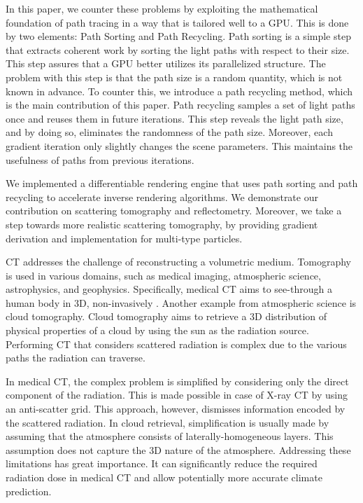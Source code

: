 \documentclass{article}
\begin{document}
In this paper, we counter these problems by exploiting the mathematical foundation of path tracing in a way that is tailored well to a \ac{GPU}. This is done by two elements: Path Sorting and Path Recycling. Path sorting is a simple step that extracts coherent work by sorting the light paths with respect to their size. This step assures that a \ac{GPU} better utilizes its parallelized structure. The problem with this step is that the path size is a random quantity, which is not known in advance. To counter this, we introduce a  path recycling method, which is the main contribution of this paper. Path recycling samples a set of light paths once and reuses them in future iterations. This step reveals the light path size, and by doing so, eliminates the randomness of the path size. Moreover, each gradient iteration only slightly changes the scene parameters. This maintains the usefulness of paths from previous iterations. 

We implemented a differentiable rendering engine that uses path sorting and path recycling to accelerate inverse rendering algorithms. We demonstrate our contribution on scattering tomography and reflectometry. Moreover, we take a step towards more realistic scattering tomography, by providing gradient derivation and implementation for multi-type particles. 

\ac{CT} addresses the challenge of reconstructing a volumetric medium. Tomography is used in various domains, such as medical imaging, atmospheric science, astrophysics, and geophysics. Specifically, medical \ac{CT} aims to see-through a human body in 3D, non-invasively . Another example from atmospheric science is cloud tomography. Cloud tomography aims to retrieve a 3D distribution of physical properties of a cloud by using the sun as the radiation source. Performing \ac{CT} that considers scattered radiation is complex due to the various paths the radiation can traverse.

In medical \ac{CT}, the complex problem is simplified by considering only the direct component of the radiation. This is made possible in case of X-ray \ac{CT} by using an anti-scatter grid. This approach, however, dismisses information encoded by the scattered radiation. In cloud retrieval, simplification is usually made by assuming that the atmosphere consists of laterally-homogeneous layers. This assumption does not capture the 3D nature of the atmosphere. Addressing these limitations has great importance. It can significantly reduce the required radiation dose in medical \ac{CT} and allow potentially more accurate climate prediction.
\end{document}
